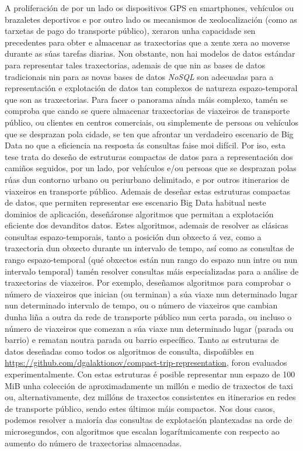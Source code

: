 A proliferaci\'on de por un lado os dispositivos GPS en smartphones, veh\'iculos ou brazaletes deportivos e por outro lado os mecanismos de xeolocalizaci\'on (como as tarxetas de pago do transporte p\'ublico), xeraron unha capacidade sen precedentes para obter e almacenar as traxectorias que a xente xera ao moverse durante as s\'uas tarefas diarias. Non obstante, non hai modelos de datos est\'andar para representar tales traxectorias, ademais de que nin as bases de datos tradicionais nin para as novas bases de datos \textit{NoSQL} son adecuadas para a representaci\'on e explotaci\'on de datos tan complexos de natureza espazo-temporal que son as traxectorias. Para facer o panorama a\'inda m\'ais complexo, tam\'en se comproba que cando se quere almacenar traxectorias de viaxeiros de transporte p\'ublico, ou clientes en centros comerciais, ou simplemente de persoas ou veh\'iculos que se desprazan pola cidade, se ten que afrontar un verdadeiro escenario de Big Data no que a eficiencia na resposta \'as consultas faise moi dif\'icil.
Por iso, esta tese trata do dese\~no de estruturas compactas de datos para a representaci\'on dos cami\~nos seguidos, por un lado, por veh\'iculos e/ou persoas que se desprazan polas r\'uas dun contorno urbano ou periurbano delimitado, e por outros itinerarios de viaxeiros en transporte p\'ublico. Ademais de dese\~nar estas estruturas compactas de datos, que permiten representar ese escenario Big Data habitual neste dominios de aplicaci\'on, dese\~n\'aronse algoritmos que permitan a explotaci\'on eficiente dos devanditos datos.
Estes algoritmos, ademais de resolver as cl\'asicas consultas espazo-temporais, tanto a posici\'on dun obxecto \'a vez, como a traxectoria dun obxecto durante un intervalo de tempo, as\'i como as consultas de rango espazo-temporal (qu\'e obxectos est\'an nun rango do espazo nun intre ou nun intervalo temporal) tam\'en resolver consultas m\'ais especializadas para a an\'alise de traxectorias de viaxeiros. Por exemplo, dese\~namos algoritmos para comprobar o n\'umero de viaxeiros que inician (ou terminan) a s\'ua viaxe nun determinado lugar nun determinado intervalo de tempo, ou o n\'umero de viaxeiros que cambian dunha li\~na a outra da rede de transporte p\'ublico nun certa parada, ou incluso o n\'umero de viaxeiros que comezan a s\'ua viaxe nun determinado lugar (parada ou barrio) e rematan noutra parada ou barrio espec\'ifico.
Tanto as estruturas de datos dese\~nadas como todos os algoritmos de consulta, dispo\~nibles en \url{https://github.com/dgalaktionov/compact-trip-representation}, foron evaluados experimentalmente. Con estas estruturas \'e posible representar nun espazo de 100 MiB unha colecci\'on de aproximadamente un mill\'on e medio de traxectos de taxi ou, alternativamente, dez mill\'ons de traxectos consistentes en itinerarios en redes de transporte p\'ublico, sendo estes \'ultimos m\'ais compactos. Nos dous casos, podemos resolver a maior\'ia das consultas de explotaci\'on plantexadas na orde de microsegundos, con algoritmos que escalan logar\'itmicamente con respecto ao aumento do n\'umero de traxectorias almacenadas.
